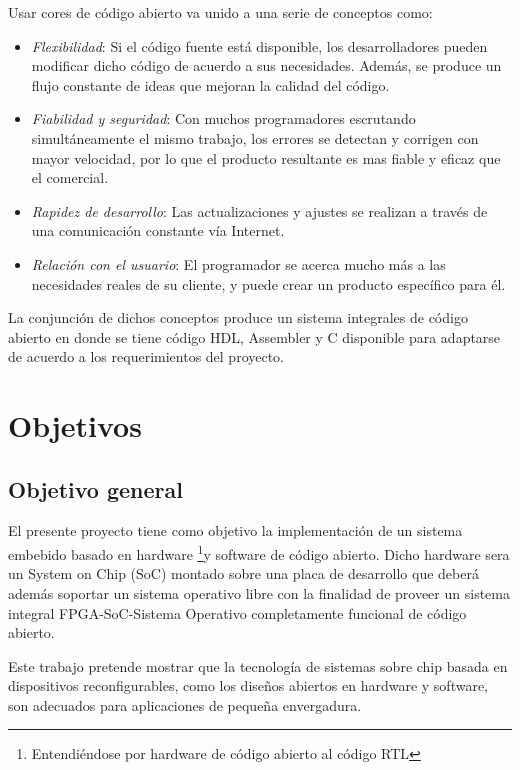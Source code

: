 Usar cores de código abierto va unido a una serie de conceptos como:
\begin{itemize}
\item \textit{Flexibilidad}: Si el código fuente está disponible, los
  desarrolladores pueden modificar dicho código de acuerdo a sus
  necesidades. Además, se produce un flujo constante de ideas que
  mejoran la calidad del código.
\item \textit{Fiabilidad y seguridad}: Con muchos programadores
  escrutando simultáneamente el mismo trabajo, los errores se detectan
  y corrigen con mayor velocidad, por lo que el producto resultante es
  mas fiable y eficaz que el comercial.
\item \textit{Rapidez de desarrollo}: Las actualizaciones y ajustes se
  realizan a través de una comunicación constante vía Internet.
\item \textit{Relación con el usuario}: El programador se acerca mucho
  más a las necesidades reales de su cliente, y puede crear un
  producto específico para él.
\end{itemize}

La conjunción de dichos conceptos produce un sistema integrales de
código abierto en donde se tiene código HDL, Assembler y C disponible
para adaptarse de acuerdo a los requerimientos del proyecto.


\section{Objetivos}
\subsection{Objetivo general}
El presente proyecto tiene como objetivo la implementación de un sistema embebido basado en hardware \footnote{Entendiéndose por hardware de código abierto al código RTL}y software de código abierto.
Dicho hardware sera un System on Chip (SoC) montado sobre una placa de desarrollo que deberá además soportar un sistema operativo
libre con la finalidad de proveer un sistema integral FPGA-SoC-Sistema
Operativo completamente funcional de código abierto.

Este trabajo pretende mostrar que la tecnología de sistemas sobre chip
basada en dispositivos reconfigurables, como los diseños abiertos en
hardware y software, son adecuados para aplicaciones de pequeña envergadura.

